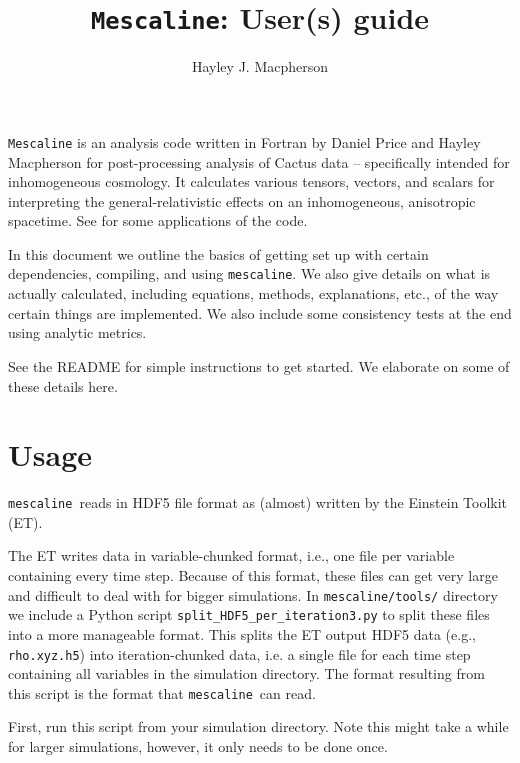 \documentclass[a4paper]{article}
\title{\texttt{Mescaline}: User(s) guide}
\author{Hayley J. Macpherson}
\newcommand{\mesc}{\texttt{mescaline}}
\begin{document}
\maketitle

\texttt{Mescaline} is an analysis code written in Fortran by Daniel Price and Hayley Macpherson for post-processing analysis of Cactus data -- specifically intended for inhomogeneous cosmology. It calculates various tensors, vectors, and scalars for interpreting the general-relativistic effects on an inhomogeneous, anisotropic spacetime. See \citet{macpherson2018b,macpherson2019b} for some applications of the code. 

In this document we outline the basics of getting set up with certain dependencies, compiling, and using \mesc. We also give details on what is actually calculated, including equations, methods, explanations, etc., of the way certain things are implemented. We also include some consistency tests at the end using analytic metrics.

See the README for simple instructions to get started. We elaborate on some of these details here.

\tableofcontents


\section{Usage}

\mesc\, reads in HDF5 file format as (almost) written by the Einstein Toolkit (ET). 

The ET writes data in variable-chunked format, i.e., one file per variable containing every time step. Because of this format, these files can get very large and difficult to deal with for bigger simulations.
In \mesc\texttt{/tools/} directory we include a Python script \texttt{split\_HDF5\_per\_iteration3.py} to split these files into a more manageable format. This splits the ET output HDF5 data (e.g., \texttt{rho.xyz.h5}) into iteration-chunked data, i.e. a single file for each time step containing all variables in the simulation directory. The format resulting from this script is the format that \mesc\ can read.

First, run this script from your simulation directory. Note this might take a while for larger simulations, however, it only needs to be done once. 
\end{document}

